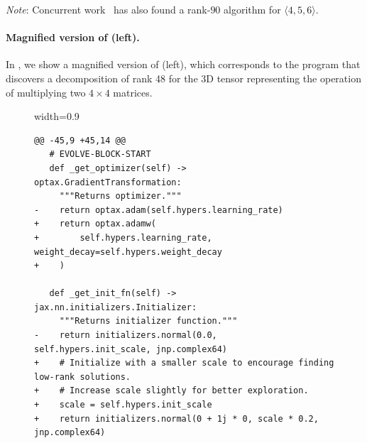 \documentclass[logo,copyright,12pt]{googledeepmind}
\theoremstyle{definition}
\theoremstyle{remark}
\theoremstyle{plain}
\begin{document}
\emph{Note}: Concurrent work~\cite{kauers2025consequences} has also found a rank-$90$ algorithm for $\langle 4, 5, 6 \rangle$.

\paragraph{Magnified version of  (left).} In , we show a magnified version of  (left), which corresponds to the program that discovers a decomposition of rank 48 for the 3D tensor representing the operation of multiplying two $4\times 4$ matrices. 


\begin{figure}[p]
\renewcommand{\thefigure}{\arabic{figure}a}\vspace{-0.03\textwidth}
\begin{adjustbox}{width=0.9\textwidth}
\begin{minipage}{0.9\textwidth}
\begin{lstlisting}[style=pydiff, backgroundcolor=\color{backcolour}]
@@ -45,9 +45,14 @@
   # EVOLVE-BLOCK-START
   def _get_optimizer(self) -> optax.GradientTransformation:
     """Returns optimizer."""
-    return optax.adam(self.hypers.learning_rate)
+    return optax.adamw(
+        self.hypers.learning_rate, weight_decay=self.hypers.weight_decay
+    )
 
   def _get_init_fn(self) -> jax.nn.initializers.Initializer:
     """Returns initializer function."""
-    return initializers.normal(0.0, self.hypers.init_scale, jnp.complex64)
+    # Initialize with a smaller scale to encourage finding low-rank solutions.
+    # Increase scale slightly for better exploration.
+    scale = self.hypers.init_scale
+    return initializers.normal(0 + 1j * 0, scale * 0.2, jnp.complex64)


\end{lstlisting}
\end{minipage}
\end{adjustbox}
\end{figure}
\end{document}
